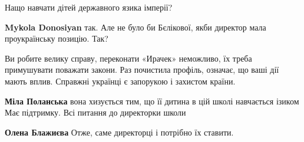 \begin{itemize}
 
Нащо навчати дітей державного язика імперії?

\begin{itemize}
 
\textbf{Mykola Donosiyan} так. Але не було би Бєлікової, якби директор мала проукраїнську позицію. Так?
\end{itemize}

 

Ви робите велику справу, переконати «Ирачек» неможливо, їх треба примушувати
поважати закони. Раз почистила профіль, означає, що ваші дії мають вплив.
Справжні українці є запорукою і захистом країни.

\begin{itemize}
 
\textbf{Міла Поланська} вона хизується тим, що її дитина в цій школі навчається ізиком
Має підтримку. Всі питання до директорки школи

 
\textbf{Олена Блажиєва} Отже, саме директорці і потрібно їх ставити.
\end{itemize}

 

\end{itemize}
